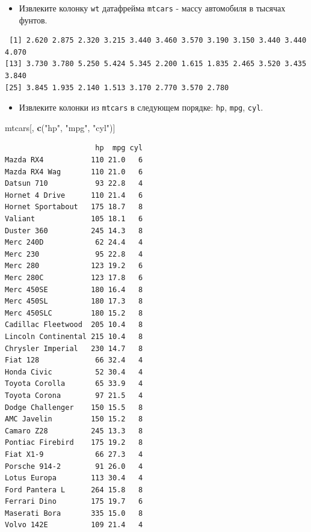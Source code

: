 \documentclass[
]{book}
\newenvironment{Shaded}{\begin{snugshade}}{\end{snugshade}}
\newcommand{\KeywordTok}[1]{\textcolor[rgb]{0.13,0.29,0.53}{\textbf{#1}}}
\newcommand{\NormalTok}[1]{#1}
\newcommand{\OperatorTok}[1]{\textcolor[rgb]{0.81,0.36,0.00}{\textbf{#1}}}
\newcommand{\StringTok}[1]{\textcolor[rgb]{0.31,0.60,0.02}{#1}}
\providecommand{\tightlist}{%
  \setlength{\itemsep}{0pt}\setlength{\parskip}{0pt}}
\begin{document}
\begin{itemize}
\tightlist
\item
  Извлеките колонку \texttt{wt} датафрейма \texttt{mtcars} - массу автомобиля в тысячах фунтов.
\end{itemize}

\begin{Shaded}
\end{Shaded}

\begin{verbatim}
 [1] 2.620 2.875 2.320 3.215 3.440 3.460 3.570 3.190 3.150 3.440 3.440 4.070
[13] 3.730 3.780 5.250 5.424 5.345 2.200 1.615 1.835 2.465 3.520 3.435 3.840
[25] 3.845 1.935 2.140 1.513 3.170 2.770 3.570 2.780
\end{verbatim}

\begin{itemize}
\tightlist
\item
  Извлеките колонки из \texttt{mtcars} в следующем порядке: \texttt{hp}, \texttt{mpg}, \texttt{cyl}.
\end{itemize}

\begin{Shaded}
\begin{Highlighting}[]
\NormalTok{mtcars[, }\KeywordTok{c}\NormalTok{(}\StringTok{"hp"}\NormalTok{, }\StringTok{"mpg"}\NormalTok{, }\StringTok{"cyl"}\NormalTok{)]}
\end{Highlighting}
\end{Shaded}

\begin{verbatim}
                     hp  mpg cyl
Mazda RX4           110 21.0   6
Mazda RX4 Wag       110 21.0   6
Datsun 710           93 22.8   4
Hornet 4 Drive      110 21.4   6
Hornet Sportabout   175 18.7   8
Valiant             105 18.1   6
Duster 360          245 14.3   8
Merc 240D            62 24.4   4
Merc 230             95 22.8   4
Merc 280            123 19.2   6
Merc 280C           123 17.8   6
Merc 450SE          180 16.4   8
Merc 450SL          180 17.3   8
Merc 450SLC         180 15.2   8
Cadillac Fleetwood  205 10.4   8
Lincoln Continental 215 10.4   8
Chrysler Imperial   230 14.7   8
Fiat 128             66 32.4   4
Honda Civic          52 30.4   4
Toyota Corolla       65 33.9   4
Toyota Corona        97 21.5   4
Dodge Challenger    150 15.5   8
AMC Javelin         150 15.2   8
Camaro Z28          245 13.3   8
Pontiac Firebird    175 19.2   8
Fiat X1-9            66 27.3   4
Porsche 914-2        91 26.0   4
Lotus Europa        113 30.4   4
Ford Pantera L      264 15.8   8
Ferrari Dino        175 19.7   6
Maserati Bora       335 15.0   8
Volvo 142E          109 21.4   4
\end{verbatim}
\end{document}
